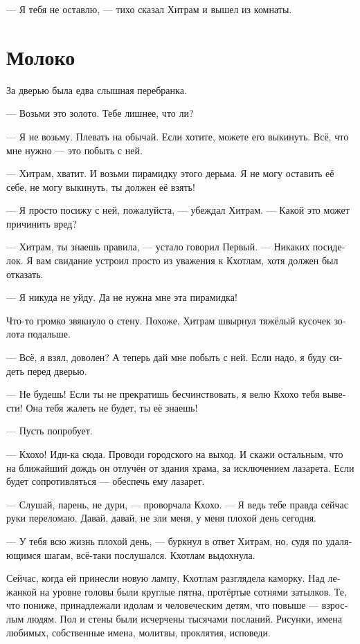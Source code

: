 \documentclass[a4paper,12pt,fleqn]{book}\usepackage{cooltooltips}\usepackage{polyglossia}\setdefaultlanguage[babelshorthands=true]{russian}\setotherlanguage{english}\defaultfontfeatures{Ligatures=TeX,Mapping=tex-text} \usepackage{xcolor}\definecolor{lightgray}{HTML}{bbbbbb}\color{lightgray}\newcommand{\ml}[3]{\textenglish{\textcolor{black}{#3}} }
\newcommand{\asterism}{\vspace{1em}{\centering\Large\bfseries$\ast~\ast~\ast$\par}\vspace{1em}}
\begin{document}
--- Я тебя не оставлю, --- тихо сказал Хитрам и вышел из комнаты.

\section{Молоко}

За дверью была едва слышная перебранка.

--- Возьми это золото.
Тебе лишнее, что ли?

--- Я не возьму.
Плевать на обычай.
Если хотите, можете его выкинуть.
Всё, что мне нужно --- это побыть с ней.

--- Хитрам, хватит.
И возьми пирамидку этого дерьма.
Я не могу оставить её себе, не могу выкинуть, ты должен её взять!

--- Я просто посижу с ней, пожалуйста, --- убеждал Хитрам.
--- Какой это может причинить вред?

--- Хитрам, ты знаешь правила, --- устало говорил Первый.
--- Никаких посиделок.
Я вам свидание устроил просто из уважения к Кхотлам, хотя должен был отказать.

--- Я никуда не уйду.
Да не нужна мне эта пирамидка!

Что-то громко звякнуло о стену.
Похоже, Хитрам швырнул тяжёлый кусочек золота подальше.

--- Всё, я взял, доволен?
А теперь дай мне побыть с ней.
Если надо, я буду сидеть перед дверью.

--- Не будешь!
Если ты не прекратишь бесчинствовать, я велю Кхохо тебя вывести!
Она тебя жалеть не будет, ты её знаешь!

--- Пусть попробует.

--- Кхохо!
Иди-ка сюда.
Проводи городского на выход.
И скажи остальным, что на ближайший дождь он отлучён от здания храма, за исключением лазарета.
Если будет сопротивляться --- обеспечь ему лазарет.

--- Слушай, парень, не дури, --- проворчала Кхохо.
--- Я ведь тебе правда сейчас руки переломаю.
Давай, давай, не зли меня, у меня плохой день сегодня.

--- У тебя всю жизнь плохой день, --- буркнул в ответ Хитрам, но, судя по удаляющимся шагам, всё-таки послушался.
Кхотлам выдохнула.

\asterism

Сейчас, когда ей принесли новую лампу, Кхотлам разглядела каморку.
Над лежанкой на уровне головы были круглые пятна, протёртые сотнями затылков.
Те, что пониже, принадлежали идолам и человеческим детям, что повыше --- взрослым людям.
Пол и стены были исчерчены тысячами посланий.
Рисунки, имена любимых, собственные имена, молитвы, проклятия, исповеди.
\end{document}
